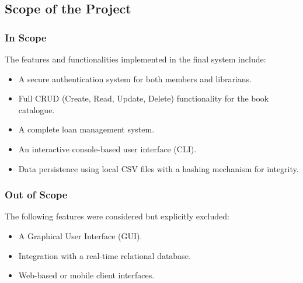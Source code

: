 \subsection{Scope of the Project}
\subsubsection{In Scope}
The features and functionalities implemented in the final system include:
\begin{itemize}
	\item A secure authentication system for both members and librarians.
	\item Full CRUD (Create, Read, Update, Delete) functionality for the book catalogue.
	\item A complete loan management system.
	\item An interactive console-based user interface (CLI).
	\item Data persistence using local CSV files with a hashing mechanism for integrity.
\end{itemize}

\subsubsection{Out of Scope}
The following features were considered but explicitly excluded:
\begin{itemize}
	\item A Graphical User Interface (GUI).
	\item Integration with a real-time relational database.
	\item Web-based or mobile client interfaces.
\end{itemize}

